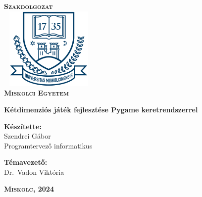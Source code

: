 \begin{titlepage}
\centering
\vspace*{2cm}
\huge\textsc{\textbf{Szakdolgozat}}\\[1cm]
\includegraphics[width=4.8cm, height=4cm,keepaspectratio]{images/me_logo.png}\\
\textbf{\textsc{Miskolci Egyetem}}

\vspace*{2cm}

{\LARGE\textbf{Kétdimenziós játék fejlesztése Pygame keretrendszerrel}}

\vspace*{2cm}
\large
\textbf{Készítette:}\\[0.8ex]
Szendrei Gábor\\[0.8ex]
Programtervező informatikus

\vspace*{0.5cm}
\textbf{Témavezető:}\\[0.8ex]
Dr.\ Vadon Viktória

\vfill

\large
\textbf{\textsc{Miskolc, 2024}}

\end{titlepage}